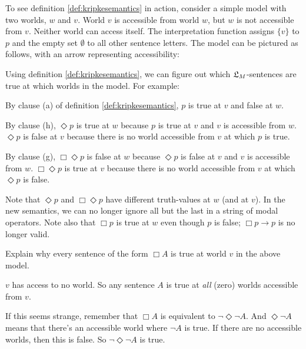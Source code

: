 To see definition \ref{def:kripkesemantics} in action, consider a simple model
with two worlds, $w$ and $v$. World $v$ is accessible from world $w$, but $w$ is
not accessible from $v$. Neither world can access itself. The interpretation
function assigns $\{ v \}$ to $p$ and the empty set $\emptyset$ to all other
sentence letters. The model can be pictured as follows, with an arrow
representing accessibility:

\begin{center}
\end{center}
%
Using definition \ref{def:kripkesemantics}, we can figure out which $\mathfrak{L}_M$-sentences
are true at which worlds in the model. For example:

\begin{itemize*}
  \item By clause (a) of definition \ref{def:kripkesemantics}, $p$ is true at
  $v$ and false at $w$.
  \item By clause (h), $\Diamond p$ is true at $w$ because $p$ is true at $v$
  and $v$ is accessible from $w$. $\Diamond p$ is false at $v$ because there is
  no world accessible from $v$ at which $p$ is true.
  \item By clause (g), $\Box\Diamond p$ is false at $w$ because $\Diamond p$ is
  false at $v$ and $v$ is accessible from $w$. $\Box\Diamond p$ is true at $v$
  because there is no world accessible from $v$ at which $\Diamond p$ is false.
\end{itemize*}
%
Note that $\Diamond p$ and $\Box \Diamond p$ have different truth-values at $w$
(and at $v$). In the new semantics, we can no longer ignore all but the last in a
string of modal operators. Note also that $\Box p$ is true at $w$ even though
$p$ is false; $\Box p \to p$ is no longer valid.

\begin{exercise}
  Explain why every sentence of the form $\Box A$ is true at world $v$
  in the above model.
\end{exercise}
\begin{solution}
  $v$ has access to no world. So any sentence $A$ is true at
  \emph{all} (zero) worlds accessible from $v$.

  If this seems strange, remember that $\Box A$ is equivalent to
  $\neg \Diamond \neg A$. And $\Diamond \neg A$ means that there's an
  accessible world where $\neg A$ is true. If there are no accessible
  worlds, then this is false. So $\neg \Diamond \neg A$ is true.
\end{solution}

